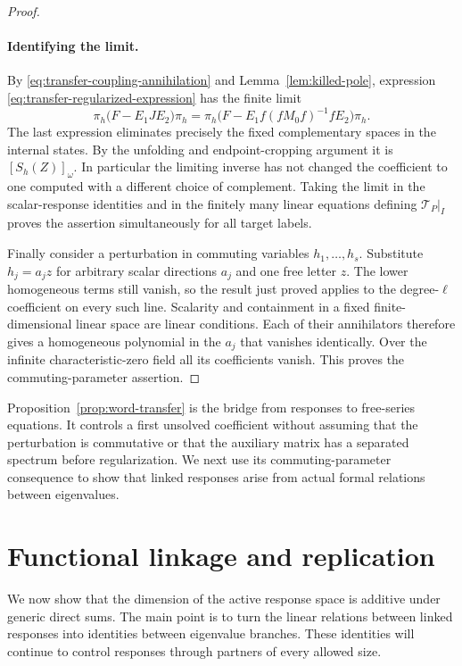 \documentclass[11pt]{article}
\theoremstyle{definition}
\theoremstyle{remark}
\numberwithin{equation}{section}
\begin{document}
\begin{proof}
\paragraph{Identifying the limit.}
By \eqref{eq:transfer-coupling-annihilation} and
Lemma~\ref{lem:killed-pole}, expression
\eqref{eq:transfer-regularized-expression} has the finite limit
\[
 \pi_h\bigl(F-E_1JE_2\bigr)\pi_h
 =\pi_h\bigl(F-E_1f(fM_0f)^{-1}fE_2\bigr)\pi_h.
\]
The last expression eliminates precisely the fixed complementary
spaces in the internal states.  By the unfolding and endpoint-cropping
argument it is $[S_h(Z)]_\omega$.  In particular the limiting inverse has
not changed the coefficient to one computed with a different choice of
complement.  Taking the limit in the scalar-response identities and in
the finitely many linear equations defining $\mathcal T_P|_I$ proves
the assertion simultaneously for all target labels.

Finally consider a perturbation in commuting variables $h_1,\ldots,h_s$.
Substitute $h_j=a_jz$ for arbitrary scalar directions $a_j$ and one free
letter $z$.  The lower homogeneous terms still vanish, so the result
just proved applies to the degree-$\ell$ coefficient on every such
line.  Scalarity and containment in a fixed finite-dimensional linear
space are linear conditions.  Each of their annihilators therefore
gives a homogeneous polynomial in the $a_j$ that vanishes identically.
Over the infinite characteristic-zero field all its coefficients vanish.
This proves the commuting-parameter assertion.
\end{proof}

Proposition~\ref{prop:word-transfer} is the bridge from responses to
free-series equations.  It controls a first unsolved coefficient without
assuming that the perturbation is commutative or that the auxiliary
matrix has a separated spectrum before regularization.  We next use its
commuting-parameter consequence to show that linked responses arise from
actual formal relations between eigenvalues.

\section{Functional linkage and replication}
\label{sec:linkage-replication}

We now show that the dimension of the active response space is additive
under generic direct sums.  The main point is to turn the linear relations
between linked responses into identities between eigenvalue branches.
These identities will continue to control responses through partners of
every allowed size.
\end{document}
